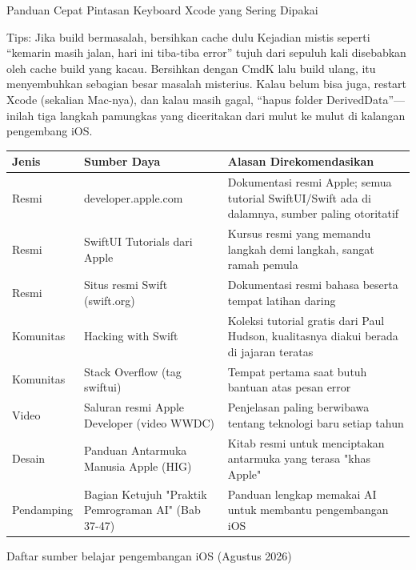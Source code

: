\begin{center}\small\color{gray}Panduan Cepat Pintasan Keyboard Xcode yang Sering Dipakai\end{center}

\begin{tcbinfo}{Tips: Jika build bermasalah, bersihkan cache dulu}
Kejadian mistis seperti “kemarin masih jalan, hari ini tiba-tiba error” tujuh dari sepuluh kali disebabkan oleh cache build yang kacau. Bersihkan dengan CmdK lalu build ulang, itu menyembuhkan sebagian besar masalah misterius. Kalau belum bisa juga, restart Xcode (sekalian Mac-nya), dan kalau masih gagal, “hapus folder DerivedData”—inilah tiga langkah pamungkas yang diceritakan dari mulut ke mulut di kalangan pengembang iOS.

\end{tcbinfo}



\begin{center}
\begin{tabularx}{\linewidth}{|X|X|X|}
\hline
\textbf{Jenis} & \textbf{Sumber Daya} & \textbf{Alasan Direkomendasikan} \tabularnewline
\hline
Resmi & developer.apple.com & Dokumentasi resmi Apple; semua tutorial SwiftUI/Swift ada di dalamnya, sumber paling otoritatif \tabularnewline
Resmi & SwiftUI Tutorials dari Apple & Kursus resmi yang memandu langkah demi langkah, sangat ramah pemula \tabularnewline
Resmi & Situs resmi Swift (swift.org) & Dokumentasi resmi bahasa beserta tempat latihan daring \tabularnewline
Komunitas & Hacking with Swift & Koleksi tutorial gratis dari Paul Hudson, kualitasnya diakui berada di jajaran teratas \tabularnewline
Komunitas & Stack Overflow (tag swiftui) & Tempat pertama saat butuh bantuan atas pesan error \tabularnewline
Video & Saluran resmi Apple Developer (video WWDC) & Penjelasan paling berwibawa tentang teknologi baru setiap tahun \tabularnewline
Desain & Panduan Antarmuka Manusia Apple (HIG) & Kitab resmi untuk menciptakan antarmuka yang terasa "khas Apple" \tabularnewline
Pendamping & Bagian Ketujuh "Praktik Pemrograman AI" (Bab 37-47) & Panduan lengkap memakai AI untuk membantu pengembangan iOS \tabularnewline
\hline
\end{tabularx}
\end{center}

\begin{center}\small\color{gray}Daftar sumber belajar pengembangan iOS (Agustus 2026)\end{center}

